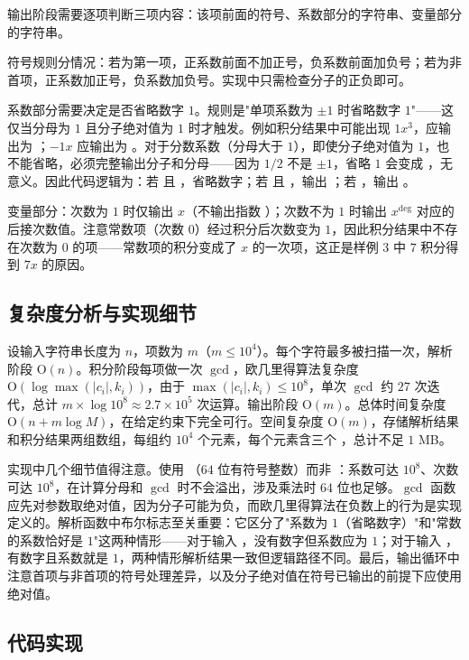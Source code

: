 输出阶段需要逐项判断三项内容：该项前面的符号、系数部分的字符串、变量部分的字符串。

符号规则分情况：若为第一项，正系数前面不加正号，负系数前面加负号；若为非首项，正系数加正号，负系数加负号。实现中只需检查分子的正负即可。

系数部分需要决定是否省略数字 $1$。规则是"单项系数为 $\pm 1$ 时省略数字 $1$"——这仅当分母为 $1$ 且分子绝对值为 $1$ 时才触发。例如积分结果中可能出现 $1x^3$，应输出为 ；$-1x$ 应输出为 。对于分数系数（分母大于 $1$），即使分子绝对值为 $1$，也不能省略，必须完整输出分子和分母——因为 $1/2$ 不是 $\pm 1$，省略 $1$ 会变成 ，无意义。因此代码逻辑为：若  且 ，省略数字；若  且 ，输出 ；若 ，输出 。

变量部分：次数为 $1$ 时仅输出 $x$（不输出指数 ）；次数不为 $1$ 时输出 $x^{\deg}$ 对应的  后接次数值。注意常数项（次数 $0$）经过积分后次数变为 $1$，因此积分结果中不存在次数为 $0$ 的项——常数项的积分变成了 $x$ 的一次项，这正是样例 $3$ 中 $7$ 积分得到 $7x$ 的原因。

\subsection{复杂度分析与实现细节}

设输入字符串长度为 $n$，项数为 $m$（$m \le 10^4$）。每个字符最多被扫描一次，解析阶段 $\mathrm{O}(n)$。积分阶段每项做一次 $\gcd$，欧几里得算法复杂度 $\mathrm{O}(\log \max(|c_i|, k_i))$，由于 $\max(|c_i|, k_i) \le 10^8$，单次 $\gcd$ 约 $27$ 次迭代，总计 $m \times \log 10^8 \approx 2.7 \times 10^5$ 次运算。输出阶段 $\mathrm{O}(m)$。总体时间复杂度 $\mathrm{O}(n + m \log M)$，在给定约束下完全可行。空间复杂度 $\mathrm{O}(m)$，存储解析结果和积分结果两组数组，每组约 $10^4$ 个元素，每个元素含三个 ，总计不足 $1$ MB。

实现中几个细节值得注意。使用 （$64$ 位有符号整数）而非 ：系数可达 $10^8$、次数可达 $10^8$，在计算分母和 $\gcd$ 时不会溢出，涉及乘法时 $64$ 位也足够。$\gcd$ 函数应先对参数取绝对值，因为分子可能为负，而欧几里得算法在负数上的行为是实现定义的。解析函数中布尔标志至关重要：它区分了"系数为 $1$（省略数字）"和"常数的系数恰好是 $1$"这两种情形——对于输入 ，没有数字但系数应为 $1$；对于输入 ，有数字且系数就是 $1$，两种情形解析结果一致但逻辑路径不同。最后，输出循环中注意首项与非首项的符号处理差异，以及分子绝对值在符号已输出的前提下应使用绝对值。

\subsection{代码实现}
\inputminted{c++}{../src/p03_polynomial_integral.cpp}
